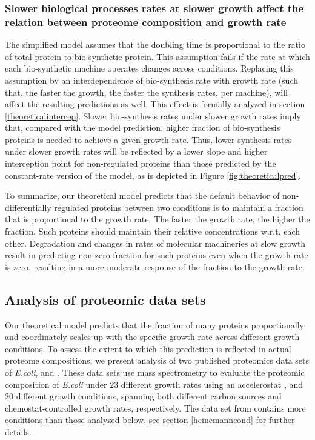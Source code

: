 \documentclass{article}
\newcommand{\hConds}{$20$}
\newcommand{\vnCondsnum}{23}
\newcommand{\vnConds}{$\vnCondsnum$}
\newcommand{\vConds}{\vnConds{}}
\begin{document}
\subsubsection{Slower biological processes rates at slower growth affect the relation between proteome composition and growth rate}
\label{slowbiosynthesis}
The simplified model assumes that the doubling time is proportional to the ratio of total protein to bio-synthetic protein.
This assumption fails if the rate at which each bio-synthetic machine operates changes across conditions.
Replacing this assumption by an interdependence of bio-synthesis rate with growth rate (such that, the faster the growth, the faster the synthesis rates, per machine)\cite{Bremer1987,Valgepea2013}, will affect the resulting predictions as well.
This effect is formally analyzed in section \ref{theoreticalintercep}.
Slower bio-synthesis rates under slower growth rates imply that, compared with the model prediction, higher fraction of bio-synthesis proteins is needed to achieve a given growth rate.
Thus, lower synthesis rates under slower growth rates will be reflected by a lower slope and higher interception point for non-regulated proteins than those predicted by the constant-rate version of the model, as is depicted in Figure \ref{fig:theoreticalpred}.

To summarize, our theoretical model predicts that the default behavior of non-differentially regulated proteins between two conditions is to maintain a fraction that is proportional to the growth rate.
The faster the growth rate, the higher the fraction.
Such proteins should maintain their relative concentrations w.r.t. each other.
Degradation and changes in rates of molecular machineries at slow growth result in predicting non-zero fraction for such proteins even when the growth rate is zero, resulting in a more moderate response of the fraction to the growth rate.

\subsection{Analysis of proteomic data sets}
Our theoretical model predicts that the fraction of many proteins proportionally and coordinately scales up with the specific growth rate across different growth conditions.
To assess the extent to which this prediction is reflected in actual proteome compositions, we present analysis of two published proteomics data sets of \emph{E.coli}, \cite{Peebo_2015} and \cite{Schmidt2015}.
These data sets use mass spectrometry to evaluate the proteomic composition of \emph{E.coli} under \vConds{} different growth rates using an accelerostat \cite{Paalme_1995}, and \hConds{} different growth conditions, spanning both different carbon sources and chemostat-controlled growth rates, respectively.
The data set from \cite{Schmidt2015} contains more conditions than those analyzed below, see section \ref{heinemanncond} for further details.
\end{document}

